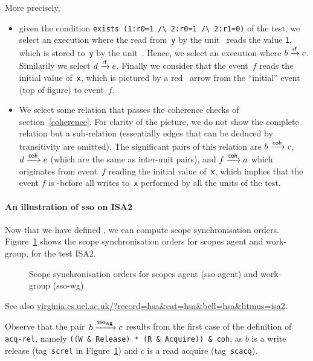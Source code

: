 \documentclass[a4paper]{article}
\begin{document}
More precisely,
\begin{itemize}
\item given the condition \verb+exists (1:r0=1 /\ 2:r0=1 /\ 2:r1=0)+ of the
test, we select an execution where the read from~\texttt{y} by the
unit~ reads the value \texttt{1}, which is stored to~\texttt{y} by the
unit~.  Hence, we select an execution where $b \xrightarrow{\textsf{\scriptsize{}rf}} c$.  Similarily we
select $d \xrightarrow{\textsf{\scriptsize{}rf}} e$.  Finally we consider that the event~$f$ reads the initial
value of~\texttt{x}, which is pictured by a red~\rf{} arrow from the
``initial'' event  (top of figure) to event~$f$.

\item We select some \coh{} relation that passes the coherence checks of
section~\ref{coherence}.  For clarity of the picture, we do not show the
complete \coh{} relation but a sub-relation (essentially edges that can be
deduced by transitivity are omitted).  The significant pairs of this \coh{}
relation are $b \xrightarrow{\textsf{\scriptsize{}coh}} c$, $d \xrightarrow{\textsf{\scriptsize{}coh}} e$ (which are the same as inter-unit \rf{}
pairs), and $f \xrightarrow{\textsf{\scriptsize{}coh}} a$ which originates from event~$f$ reading the initial
value of~\texttt{x}, which implies that the event $f$  is \coh-before all
writes to~\texttt{x} performed by all the units of the test.
\end{itemize}

\paragraph{An illustration of sso on ISA2}

Now that we have defined \coh{}, we can compute scope synchronisation orders.
Figure~\ref{isa2sso} shows the scope synchronisation orders for scopes agent
and work-group, for the test ISA2.
\begin{figure}[!h]
\begin{center}\moveback{}
\end{center}
\caption{\label{isa2sso}Scope synchronisation orders for scopes agent (\textsf{sso-agent}) and work-group (\textsf{sso-wg}) \color{green}{(Allowed)}}
\end{figure}

See also
\url{virginia.cs.ucl.ac.uk/?record=hsa&cat=hsa&bell=hsa&litmus=isa2}.

Observe that the pair~$b \xrightarrow{\textsf{\scriptsize{}sso$_{\textsf{\scriptsize{}wg}}$}} c$ results from the first case of the
definition of \verb+acq-rel+, namely 
\verb+((W & Release) * (R & Acquire)) & coh+, 
as $b$ is a write release (tag~\texttt{screl} in Figure~\ref{isa2sso}) and $c$
is a read acquire (tag~\texttt{scacq}).
\end{document}
